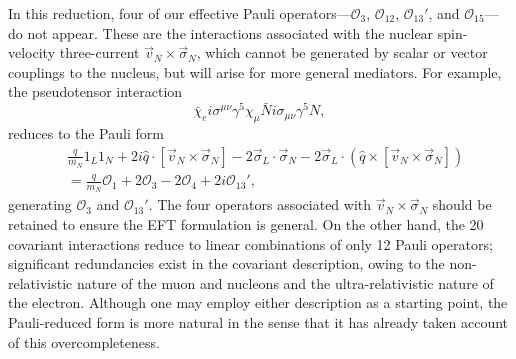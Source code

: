 \documentclass{book}[letterpaper,12pt]
\begin{document}
In this reduction, four of our effective Pauli operators---$\mathcal{O}_3$, $\mathcal{O}_{12}$, $\mathcal{O}_{13}'$, and $\mathcal{O}_{15}$---do not appear. These are the interactions associated with the nuclear spin-velocity three-current $\vec{v}_N\times\vec{\sigma}_N$, which cannot be generated by scalar or vector couplings to the nucleus, but will arise for more general mediators. For example, the pseudotensor interaction
\begin{equation}
\bar{\chi}_ei\sigma^{\mu\nu}\gamma^5\chi_{\mu}\bar{N}i\sigma_{\mu\nu}\gamma^5N,
\end{equation}
reduces to the Pauli form
\begin{equation}
\begin{split}
&\frac{q}{m_N}1_L1_N+2i\hat{q}\cdot\left[\vec{v}_N\times\vec{\sigma}_N\right]-2\vec{\sigma}_L\cdot\vec{\sigma}_N-2\vec{\sigma}_L\cdot\left(\hat{q}\times\left[\vec{v}_N\times\vec{\sigma}_N\right]\right)\\
&=\frac{q}{m_N}\mathcal{O}_1+2\mathcal{O}_3-2\mathcal{O}_4+2i\mathcal{O}_{13}',
\end{split}
\end{equation}
generating $\mathcal{O}_3$ and $\mathcal{O}_{13}'$. The four operators associated with $\vec{v}_N\times\vec{\sigma}_N$ should be retained to ensure the EFT formulation is general. On the other hand, the 20 covariant interactions reduce to linear combinations of only 12 Pauli operators; significant redundancies exist in the covariant description, owing to the non-relativistic nature of the muon and nucleons and the ultra-relativistic nature of the electron. Although one may employ either description as a starting point, the Pauli-reduced form is more natural in the sense that it has already taken account of this overcompleteness.
\end{document}
